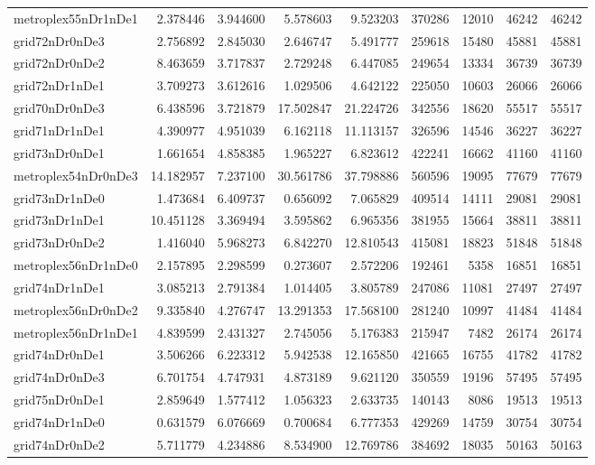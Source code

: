 \begin{longtable}{|l|r|r|r|r|r|r|r|r|}
metroplex55nDr1nDe1 & 2.378446 & 3.944600 & 5.578603 & 9.523203 & 370286 & 12010 & 46242 & 46242 \\
grid72nDr0nDe3 & 2.756892 & 2.845030 & 2.646747 & 5.491777 & 259618 & 15480 & 45881 & 45881 \\
grid72nDr0nDe2 & 8.463659 & 3.717837 & 2.729248 & 6.447085 & 249654 & 13334 & 36739 & 36739 \\
grid72nDr1nDe1 & 3.709273 & 3.612616 & 1.029506 & 4.642122 & 225050 & 10603 & 26066 & 26066 \\
grid70nDr0nDe3 & 6.438596 & 3.721879 & 17.502847 & 21.224726 & 342556 & 18620 & 55517 & 55517 \\
grid71nDr1nDe1 & 4.390977 & 4.951039 & 6.162118 & 11.113157 & 326596 & 14546 & 36227 & 36227 \\
grid73nDr0nDe1 & 1.661654 & 4.858385 & 1.965227 & 6.823612 & 422241 & 16662 & 41160 & 41160 \\
metroplex54nDr0nDe3 & 14.182957 & 7.237100 & 30.561786 & 37.798886 & 560596 & 19095 & 77679 & 77679 \\
grid73nDr1nDe0 & 1.473684 & 6.409737 & 0.656092 & 7.065829 & 409514 & 14111 & 29081 & 29081 \\
grid73nDr1nDe1 & 10.451128 & 3.369494 & 3.595862 & 6.965356 & 381955 & 15664 & 38811 & 38811 \\
grid73nDr0nDe2 & 1.416040 & 5.968273 & 6.842270 & 12.810543 & 415081 & 18823 & 51848 & 51848 \\
metroplex56nDr1nDe0 & 2.157895 & 2.298599 & 0.273607 & 2.572206 & 192461 & 5358 & 16851 & 16851 \\
grid74nDr1nDe1 & 3.085213 & 2.791384 & 1.014405 & 3.805789 & 247086 & 11081 & 27497 & 27497 \\
metroplex56nDr0nDe2 & 9.335840 & 4.276747 & 13.291353 & 17.568100 & 281240 & 10997 & 41484 & 41484 \\
metroplex56nDr1nDe1 & 4.839599 & 2.431327 & 2.745056 & 5.176383 & 215947 & 7482 & 26174 & 26174 \\
grid74nDr0nDe1 & 3.506266 & 6.223312 & 5.942538 & 12.165850 & 421665 & 16755 & 41782 & 41782 \\
grid74nDr0nDe3 & 6.701754 & 4.747931 & 4.873189 & 9.621120 & 350559 & 19196 & 57495 & 57495 \\
grid75nDr0nDe1 & 2.859649 & 1.577412 & 1.056323 & 2.633735 & 140143 & 8086 & 19513 & 19513 \\
grid74nDr1nDe0 & 0.631579 & 6.076669 & 0.700684 & 6.777353 & 429269 & 14759 & 30754 & 30754 \\
grid74nDr0nDe2 & 5.711779 & 4.234886 & 8.534900 & 12.769786 & 384692 & 18035 & 50163 & 50163 \\

\end{longtable}
